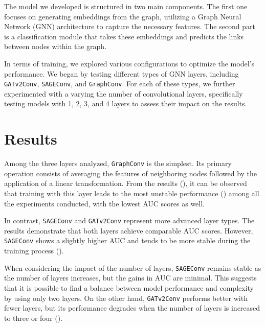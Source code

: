 \documentclass[11pt]{article}
\begin{document}
The model we developed is structured in two main components. 
%
The first one focuses on generating embeddings from the graph, 
  utilizing a Graph Neural Network (GNN) architecture to capture the necessary features. 
%  
The second part is a classification module that takes these embeddings and predicts the links 
  between nodes within the graph.

In terms of training, we explored various configurations to optimize the model's performance.
%
We began by testing different types of GNN layers, including \texttt{GATv2Conv}, \texttt{SAGEConv}, and \texttt{GraphConv}. 
%
For each of these types, we further experimented with a varying the number of convolutional layers, 
  specifically testing models with 1, 2, 3, and 4 layers to assess their impact on the results.

\section{Results}\label{sec:resutls}

Among the three layers analyzed, \texttt{GraphConv} is the simplest. 
%
Its primary operation consists of averaging the features of neighboring nodes followed by the application of a linear transformation. 
%
From the results (), it can be observed that training with this layer leads to the most unstable performance () among all 
%
the experiments conducted, with the lowest AUC scores as well.

In contrast, \texttt{SAGEConv} and \texttt{GATv2Conv} represent more advanced layer types. 
%
The results demonstrate that both layers achieve comparable AUC scores. 
%
However, \texttt{SAGEConv} shows a slightly higher AUC and tends to be more stable during the training process ().

When considering the impact of the number of layers, \texttt{SAGEConv} remains stable as the number of 
%
layers increases, but the gains in AUC are minimal. 
%
This suggests that it is possible to find a balance between model performance and complexity by using only two layers. 
%
On the other hand, \texttt{GATv2Conv} performs better with fewer layers, but its performance degrades when the number 
%
of layers is increased to three or four ().
\end{document}
